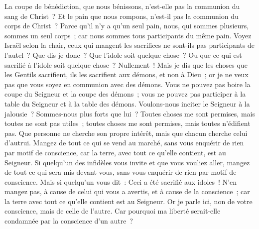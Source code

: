 \begin{multicols}{2}
La coupe de bénédiction, que nous bénissons, n'est-elle pas la communion du sang de Christ~? Et le pain que nous rompons, n'est-il pas la communion du corps de Christ~?
Parce qu'il n'y a qu'un seul pain, nous, qui sommes plusieurs, sommes un seul corps~; car nous sommes tous participants du même pain.
Voyez Israël selon la chair, ceux qui mangent les sacrifices ne sont-ils pas participants de l'autel~?
Que dis-je donc~? Que l'idole soit quelque chose~? Ou que ce qui est sacrifié à l'idole soit quelque chose~? Nullement~!
Mais je dis que les choses que les Gentils sacrifient, ils les sacrifient aux démons, et non à Dieu~; or je ne veux pas que vous soyez en communion avec des démons.
Vous ne pouvez pas boire la coupe du Seigneur et la coupe des démons~; vous ne pouvez pas participer à la table du Seigneur et à la table des démons.
Voulons-nous inciter le Seigneur à la jalousie~? Sommes-nous plus forts que lui~?
Toutes choses me sont permises, mais toutes ne sont pas utiles~; toutes choses me sont permises, mais toutes n'édifient pas.
Que personne ne cherche son propre intérêt, mais que chacun cherche celui d'autrui.
Mangez de tout ce qui se vend au marché, sans vous enquérir de rien par motif de conscience,
car la terre, avec tout ce qu'elle contient, est au Seigneur.
Si quelqu'un des infidèles vous invite et que vous vouliez aller, mangez de tout ce qui sera mis devant vous, sans vous enquérir de rien par motif de conscience.
Mais si quelqu'un vous dit~: Ceci a été sacrifié aux idoles~! N'en mangez pas, à cause de celui qui vous a avertis, et à cause de la conscience~; car la terre avec tout ce qu'elle contient est au Seigneur.
Or je parle ici, non de votre conscience, mais de celle de l'autre. Car pourquoi ma liberté serait-elle condamnée par la conscience d'un autre~?

\end{multicols}
